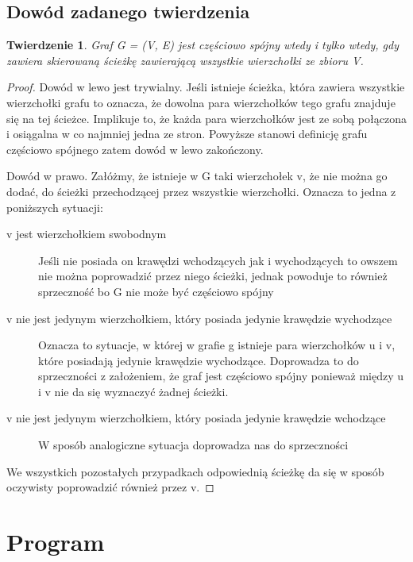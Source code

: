 \documentclass[a4paper,10pt]{article}
\newtheorem{twr}{Twierdzenie}
\begin{document}
\subsection{Dowód zadanego twierdzenia}

\begin{twr}
  Graf G = (V, E) jest częściowo spójny wtedy i tylko wtedy, gdy
  zawiera skierowaną ścieżkę zawierającą wszystkie wierzchołki ze
  zbioru V.
\end{twr}

\begin{proof}
  Dowód w lewo jest trywialny. Jeśli istnieje ścieżka, która zawiera
  wszystkie wierzchołki grafu to oznacza, że dowolna para wierzchołków
  tego grafu znajduje się na tej ścieżce. Implikuje to, że każda para
  wierzchołków jest ze sobą połączona i osiągalna w co najmniej jedna
  ze stron. Powyższe stanowi definicję grafu częściowo spójnego zatem
  dowód w lewo zakończony.

  Dowód w prawo. Załóżmy, że istnieje w G taki wierzchołek v, że nie
  można go dodać, do ścieżki przechodzącej przez wszystkie
  wierzchołki. Oznacza to jedna z poniższych sytuacji:

  \begin{description}
  \item[v jest wierzchołkiem swobodnym] Jeśli nie posiada on krawędzi
    wchodzących jak i wychodzących to owszem nie można poprowadzić
    przez niego ścieżki, jednak powoduje to również sprzeczność bo G
    nie może być częściowo spójny
  \item[v nie jest jedynym wierzchołkiem, który posiada jedynie
    krawędzie wychodzące] Oznacza to sytuacje, w której w grafie g
    istnieje para wierzchołków u i v, które posiadają jedynie
    krawędzie wychodzące. Doprowadza to do sprzeczności z założeniem,
    że graf jest częściowo spójny ponieważ między u i v nie da się
    wyznaczyć żadnej ścieżki.
    \item[v nie jest jedynym wierzchołkiem, który posiada jedynie
    krawędzie wchodzące] W sposób analogiczne sytuacja doprowadza nas do sprzeczności
  \end{description}

  We wszystkich pozostałych przypadkach odpowiednią ścieżkę da się w
  sposób oczywisty poprowadzić również przez v.
\end{proof}

\section{Program}
\end{document}
